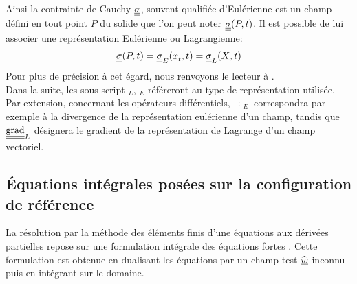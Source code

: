 \documentclass[10pt]{book}
\begin{document}
Ainsi la contrainte de Cauchy $\underline{\underline{\sigma}}$, souvent qualifiée \og d'Eulérienne \fg{} est un champ défini en tout point $P$ du solide que l'on peut noter $\underline{\underline{\sigma}}(P,t)$. Il est possible de lui associer une représentation Eulérienne ou Lagrangienne:
$$\underline{\underline{\sigma}}(P,t)=\underline{\underline{\sigma}}_{E}(\underline{x}_{t},t)=\underline{\underline{\sigma}}_{L}(\underline{X},t)$$
Pour plus de précision à cet égard, nous renvoyons le lecteur à \cite{garrigues2016algebre, garrigues2016cinematique}.\\

Dans la suite, les sous script $_{L}$, $_{E}$ référeront au type de représentation utilisée. Par extension, concernant les opérateurs différentiels, $\div_{E}$ correspondra par exemple à la divergence de la représentation eulérienne d'un champ, tandis que $\tgrad_{L}$ désignera le gradient de la représentation de Lagrange d'un champ vectoriel.
\subsection{Équations intégrales posées sur la configuration de référence}
La résolution par la méthode des éléments finis d'une équations aux dérivées partielles repose sur une formulation intégrale des équations \og fortes \fg{}. Cette formulation est obtenue en dualisant les équations par un champ test $\widehat{\underline{w}}$ inconnu puis en intégrant sur le domaine.\\
\end{document}
